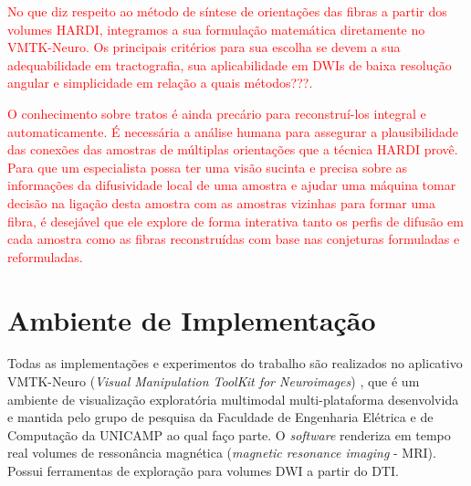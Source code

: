 \documentclass[
    12pt,                %
    oneside,            %
    a4paper,            %
    english,            %
    french,                %
    spanish,            %
    brazil                %
    ]{abntex2}
\begin{document}
\textcolor{red}{No que diz respeito ao método de síntese de orientações das fibras a partir dos volumes HARDI, integramos a sua formulação matemática diretamente no VMTK-Neuro. Os principais critérios para sua escolha se devem a sua adequabilidade em tractografia, sua aplicabilidade em DWIs de baixa resolução angular e simplicidade em relação a quais métodos???.}


\textcolor{red}{O conhecimento sobre tratos é ainda precário para reconstruí-los integral e automaticamente. É necessária a análise humana para assegurar a plausibilidade das conexões das amostras de múltiplas orientações que a técnica HARDI provê. Para que um especialista possa ter uma visão sucinta e precisa sobre as informações da difusividade local de uma amostra e ajudar uma máquina tomar decisão na ligação desta amostra com as amostras vizinhas para formar uma fibra, é desejável que ele explore de forma interativa tanto os perfis de difusão em cada amostra como as fibras reconstruídas com base nas conjeturas formuladas e reformuladas.}

\section{Ambiente de Implementação}
\label{ssec:ambiente}

Todas as implementações e experimentos do trabalho são realizados no aplicativo VMTK-Neuro (\textit{Visual Manipulation ToolKit for Neuroimages}) \cite{VMTKNeuro}, que é um ambiente de visualização exploratória multimodal multi-plataforma desenvolvida e mantida pelo grupo de pesquisa da Faculdade de Engenharia Elétrica e de Computação da UNICAMP ao qual faço parte. O \textit{software} renderiza em tempo real volumes de ressonância magnética (\textit{magnetic resonance imaging} - MRI). Possui ferramentas de exploração para volumes DWI a partir do DTI.%
\end{document}
